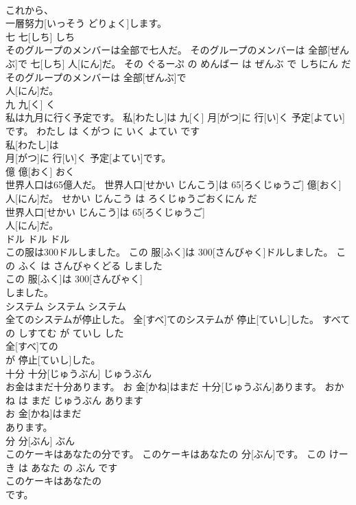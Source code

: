 \documentclass[8pt]{extreport}
\begin{document}
\begin{CJK}{UTF8}{min}
\\	これから、
\\	一層努力[いっそう どりょく]します。			
\\	七	七[しち]	しち	
\\	そのグループのメンバーは全部で七人だ。	そのグループのメンバーは 全部[ぜんぶ]で 七[しち] 人[にん]だ。	その ぐるーぷ の めんばー は ぜんぶ で しちにん だ	
\\	そのグループのメンバーは 全部[ぜんぶ]で
\\	人[にん]だ。			
\\	九	九[く]	く	
\\	私は九月に行く予定です。	私[わたし]は 九[く] 月[がつ]に 行[い]く 予定[よてい]です。	わたし は くがつ に いく よてい です	
\\	私[わたし]は
\\	月[がつ]に 行[い]く 予定[よてい]です。			
\\	億	億[おく]	おく	
\\	世界人口は65億人だ。	世界人口[せかい じんこう]は 65[ろくじゅうご] 億[おく] 人[にん]だ。	せかい じんこう は ろくじゅうごおくにん だ	
\\	世界人口[せかい じんこう]は 65[ろくじゅうご]
\\	人[にん]だ。			
\\	ドル	ドル	ドル	
\\	この服は300ドルしました。	この 服[ふく]は 300[さんびゃく]ドルしました。	この ふく は さんびゃくどる しました	
\\	この 服[ふく]は 300[さんびゃく]
\\	しました。			
\\	システム	システム	システム	
\\	全てのシステムが停止した。	全[すべ]てのシステムが 停止[ていし]した。	すべて の しすてむ が ていし した	
\\	全[すべ]ての
\\	が 停止[ていし]した。			
\\	十分	十分[じゅうぶん]	じゅうぶん	
\\	お金はまだ十分あります。	お 金[かね]はまだ 十分[じゅうぶん]あります。	おかね は まだ じゅうぶん あります	
\\	お 金[かね]はまだ
\\	あります。			
\\	分	分[ぶん]	ぶん	
\\	このケーキはあなたの分です。	このケーキはあなたの 分[ぶん]です。	この けーき は あなた の ぶん です	
\\	このケーキはあなたの
\\	です。			

\end{CJK}
\end{document}
